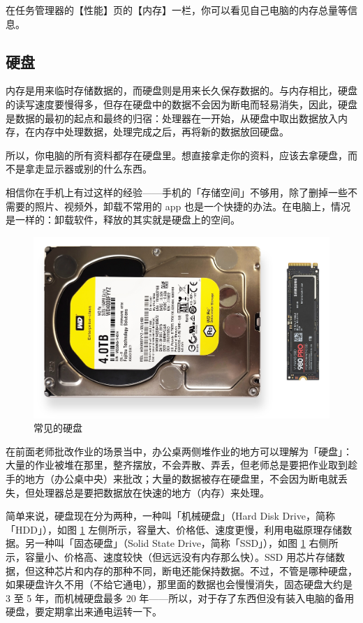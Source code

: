 在任务管理器的【性能】页的【内存】一栏，你可以看见自己电脑的内存总量等信息。

\subsection{硬盘}

内存是用来临时存储数据的，而硬盘则是用来长久保存数据的。与内存相比，硬盘的读写速度要慢得多，但存在硬盘中的数据不会因为断电而轻易消失，因此，硬盘是数据的最初的起点和最终的归宿：处理器在一开始，从硬盘中取出数据放入内存，在内存中处理数据，处理完成之后，再将新的数据放回硬盘。

\begin{note}
  所以，你电脑的所有资料都存在硬盘里。想直接拿走你的资料，应该去拿硬盘，而不是拿走显示器或别的什么东西。
\end{note}

相信你在手机上有过这样的经验——手机的「存储空间」不够用，除了删掉一些不需要的照片、视频外，卸载不常用的 app 也是一个快捷的办法。在电脑上，情况是一样的：卸载软件，释放的其实就是硬盘上的空间。

\begin{figure}[htb!]
  \centering
  \includegraphics[width=.7\textwidth]{assets/basic/HDD_and_SSD.png}
  \caption{常见的硬盘}
  \label{fig:HDD_and_SSD}
\end{figure}

在前面老师批改作业的场景当中，办公桌两侧堆作业的地方可以理解为「硬盘」：大量的作业被堆在那里，整齐摆放，不会弄散、弄丢，但老师总是要把作业取到趁手的地方（办公桌中央）来批改；大量的数据被存在硬盘里，不会因为断电就丢失，但处理器总是要把数据放在快速的地方（内存）来处理。

简单来说，硬盘现在分为两种，一种叫「机械硬盘」（Hard Disk Drive，简称「HDD」），如图 \ref{fig:HDD_and_SSD} 左侧所示，容量大、价格低、速度更慢，利用电磁原理存储数据。另一种叫「固态硬盘」（Solid State Drive，简称「SSD」），如图 \ref{fig:HDD_and_SSD} 右侧所示，容量小、价格高、速度较快（但远远没有内存那么快）。SSD 用芯片存储数据，但这种芯片和内存的那种不同，断电还能保持数据。不过，不管是哪种硬盘，如果硬盘许久不用（不给它通电），那里面的数据也会慢慢消失，固态硬盘大约是 3 至 5 年，而机械硬盘最多 20 年——所以，对于存了东西但没有装入电脑的备用硬盘，要定期拿出来通电运转一下。


